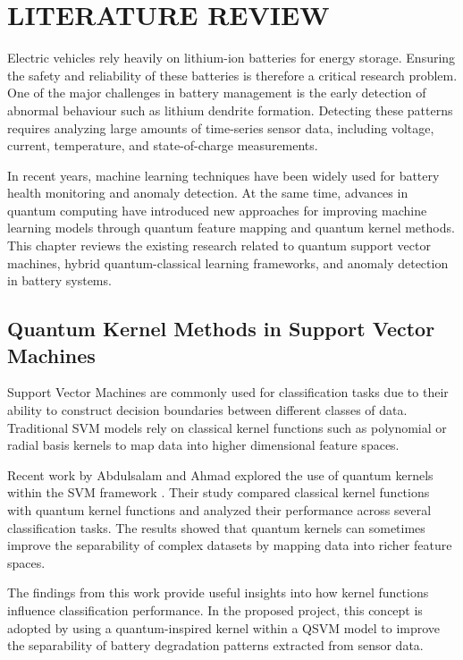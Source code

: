 \chapter{LITERATURE REVIEW}

Electric vehicles rely heavily on lithium-ion batteries for energy storage. Ensuring the safety and reliability of these batteries is therefore a critical research problem. One of the major challenges in battery management is the early detection of abnormal behaviour such as lithium dendrite formation. Detecting these patterns requires analyzing large amounts of time-series sensor data, including voltage, current, temperature, and state-of-charge measurements.

In recent years, machine learning techniques have been widely used for battery health monitoring and anomaly detection. At the same time, advances in quantum computing have introduced new approaches for improving machine learning models through quantum feature mapping and quantum kernel methods. This chapter reviews the existing research related to quantum support vector machines, hybrid quantum-classical learning frameworks, and anomaly detection in battery systems.

\section{Quantum Kernel Methods in Support Vector Machines}

Support Vector Machines are commonly used for classification tasks due to their ability to construct decision boundaries between different classes of data. Traditional SVM models rely on classical kernel functions such as polynomial or radial basis kernels to map data into higher dimensional feature spaces.

Recent work by Abdulsalam and Ahmad explored the use of quantum kernels within the SVM framework \cite{qml_kernel_2025}. Their study compared classical kernel functions with quantum kernel functions and analyzed their performance across several classification tasks. The results showed that quantum kernels can sometimes improve the separability of complex datasets by mapping data into richer feature spaces.

The findings from this work provide useful insights into how kernel functions influence classification performance. In the proposed project, this concept is adopted by using a quantum-inspired kernel within a QSVM model to improve the separability of battery degradation patterns extracted from sensor data.

